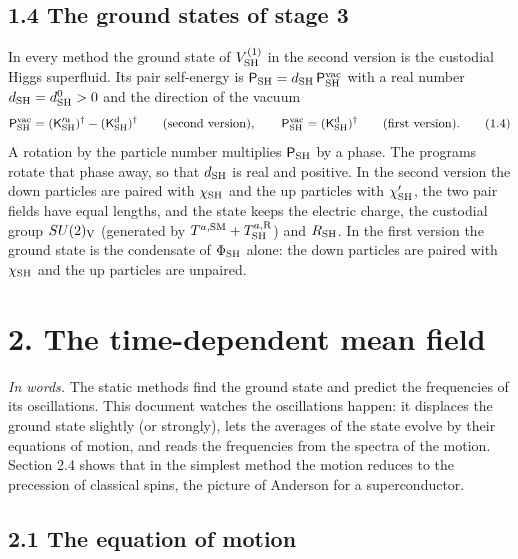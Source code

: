 \documentclass[
  10pt,
]{article}
\begin{document}
\hypertarget{the-ground-states-of-stage-3}{%
\subsection{1.4 The ground states of stage
3}\label{the-ground-states-of-stage-3}}

In every method the ground state of \(V^{(1)}_{\rm SH}\) in the second
version is the custodial Higgs superfluid. Its pair self-energy is
\(\mathsf P_{\rm SH}=d_{\rm SH}\,\mathsf P^{\rm vac}_{\rm SH}\) with a
real number \(d_{\rm SH}=d^0_{\rm SH}>0\) and the direction of the
vacuum
\[\mathsf P^{\rm vac}_{\rm SH}=(\mathsf K'^{\rm u}_{\rm SH})^\dagger-(\mathsf K^{\rm d}_{\rm SH})^\dagger\qquad\text{(second version)},\qquad
\mathsf P^{\rm vac}_{\rm SH}=(\mathsf K^{\rm d}_{\rm SH})^\dagger\qquad\text{(first version)}.\tag{1.4}\]
A rotation by the particle number multiplies \(\mathsf P_{\rm SH}\) by a
phase. The programs rotate that phase away, so that \(d_{\rm SH}\) is
real and positive. In the second version the down particles are paired
with \(\chi_{\rm SH}\) and the up particles with \(\chi'_{\rm SH}\), the
two pair fields have equal lengths, and the state keeps the electric
charge, the custodial group \(SU(2)_{\rm V}\) (generated by
\(T^{a,{\rm SM}}+T^{a,{\rm R}}_{\rm SH}\)) and \(R_{\rm SH}\). In the
first version the ground state is the condensate of \(\Phi_{\rm SH}\)
alone: the down particles are paired with \(\chi_{\rm SH}\) and the up
particles are unpaired.

\hypertarget{the-time-dependent-mean-field}{%
\section{2. The time-dependent mean
field}\label{the-time-dependent-mean-field}}

\emph{In words.} The static methods find the ground state and predict
the frequencies of its oscillations. This document watches the
oscillations happen: it displaces the ground state slightly (or
strongly), lets the averages of the state evolve by their equations of
motion, and reads the frequencies from the spectra of the motion.
Section 2.4 shows that in the simplest method the motion reduces to the
precession of classical spins, the picture of Anderson for a
superconductor.

\hypertarget{the-equation-of-motion}{%
\subsection{2.1 The equation of motion}\label{the-equation-of-motion}}
\end{document}
